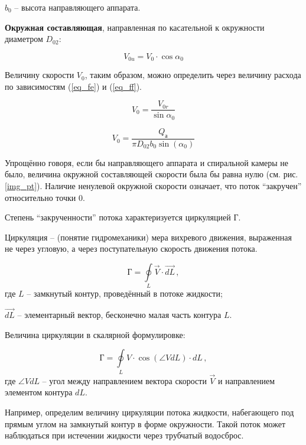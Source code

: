 $ b_0 $ -- высота направляющего аппарата.

\vspace{0.5 cm}

\textbf{Окружная составляющая}, направленная по касательной к окружности диаметром $ D_{02} $:

\begin{equation}
\label{eq_fj}
   V_{0u} = V_0 \cdot  \cos\alpha_0
\end{equation}

Величину скорости $ V_0 $, таким образом, можно определить через величину расхода по зависимостям (\ref{eq_fe}) и (\ref{eq_ff}).

$$
   V_0 = \frac{V_{0r}}{\sin\alpha_0}
$$

$$
   V_0 = \frac{Q_{а}}{\pi D_{02} b_0 \sin(\alpha_0)}
$$

Упрощённо говоря, если бы направляющего аппарата и спиральной камеры не было, величина окружной составляющей скорости была бы равна нулю (см. рис.\ref{img_pt}). Наличие ненулевой окружной скорости означает, что поток ``закручен'' относительно точки 0.

Степень ``закрученности'' потока характеризуется циркуляцией Г.

\begin{opred}
   Циркуляция -- (понятие гидромеханики) мера вихревого движения, выраженная не через угловую, а через поступательную скорость движения потока.
\end{opred}

$$
   \text{Г} = \oint\limits_{L} \vec{V} \cdot \vec{dL} \, , 
$$
где $ L $ -- замкнутый контур, проведённый в потоке жидкости;

$ \vec{dL} $ -- элементарный вектор, бесконечно малая часть контура $ L $.

\vspace{0.5 cm}

Величина циркуляции в скалярной формулировке:

$$
   \text{Г} = \oint\limits_{L} {V} \cdot \cos(\angle V dL) \cdot {dL} \, , 
$$
где $ \angle V dL $ -- угол между направлением вектора скорости $\vec{V}$ и направлением элементом контура $dL$.

\vspace{0.5 cm}

Например, определим величину циркуляции потока жидкости, набегающего под прямым углом на замкнутый контур в форме окружности. Такой поток может наблюдаться при истечении жидкости через трубчатый водосброс.

